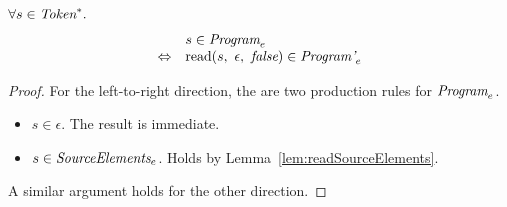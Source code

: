 \documentclass[preprint,10pt]{sigplanconf}
\begin{document}
\begin{theorem}\mbox{}

  \( \forall s \in \textit{Token}^*. \)
  \[
  \begin{array}{rl}
  &s \in \textit{Program}_{e} \\
  \Leftrightarrow&
  \textrm{read}(s,~\epsilon,~\textit{false}) \in \textit{Program'}_{e}
  \end{array}
  \]
\end{theorem}
\begin{proof}

  For the left-to-right direction, the are two production rules for 
  \( \textit{Program}_{e} \).
  \begin{itemize}
  \item \( s \in \epsilon \). The result is immediate.

  \item \( s \in \textit{SourceElements}_{e} \).
    Holds by Lemma~\ref{lem:readSourceElements}.
  \end{itemize}

  A similar argument holds for the other direction.
\end{proof}
\end{document}
